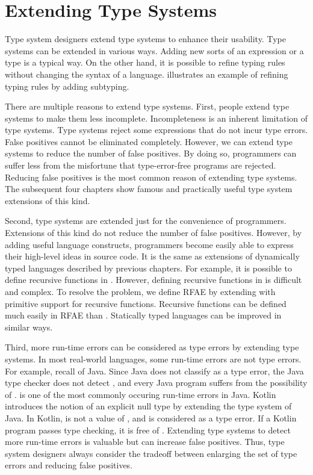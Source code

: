 \section{Extending Type Systems}

Type system designers extend type systems to enhance their usability. Type
systems can be extended in various ways. Adding new sorts of an expression or
a type is a typical way. On the other hand, it is possible to refine typing
rules without changing the syntax of a language. 
illustrates an example of refining typing rules by adding subtyping.

There are multiple reasons to extend type systems. First, people extend type
systems to make them less incomplete. Incompleteness is an inherent limitation
of type systems. Type systems reject some expressions that do not incur type
errors. False positives cannot be eliminated completely. However, we can extend
type systems to reduce the number of false positives. By doing so, programmers
can suffer less from the misfortune that type-error-free programs are rejected.
Reducing false positives is the most common reason of extending type systems.
The subsequent four chapters show famous and practically useful type system
extensions of this kind.

Second, type systems are extended just for the convenience of programmers.
Extensions of this kind do not reduce the number of false positives. However, by
adding useful language constructs, programmers become easily able to express
their high-level ideas in source code. It is the same as extensions of
dynamically typed languages
described by previous chapters. For example, it is possible to define recursive
functions in \plang. However, defining recursive functions in \plang is difficult
and complex. To resolve the problem, we define \textsf{RFAE} by extending \plang
with primitive support for recursive functions. Recursive functions can be
defined much easily in \textsf{RFAE} than \plang. Statically typed languages can
be improved in similar ways.

Third, more run-time errors can be considered as type errors by extending type
systems. In most real-world languages, some run-time errors are not type errors.
For example, recall  of Java. Since Java does not
classify  as a type error, the Java type checker does
not detect , and every Java program suffers from the
possibility of .  is one
of the most commonly occuring run-time errors in Java. Kotlin introduces the
notion of an explicit null type by extending the type system of Java. In Kotlin,
 is not a value of , and  is
considered as a type error. If a Kotlin program passes type checking, it is free
of . Extending type systems to detect more run-time
errors is valuable but can increase false positives. Thus, type system designers
always consider the tradeoff between enlarging the set of type errors and reducing false
positives.

